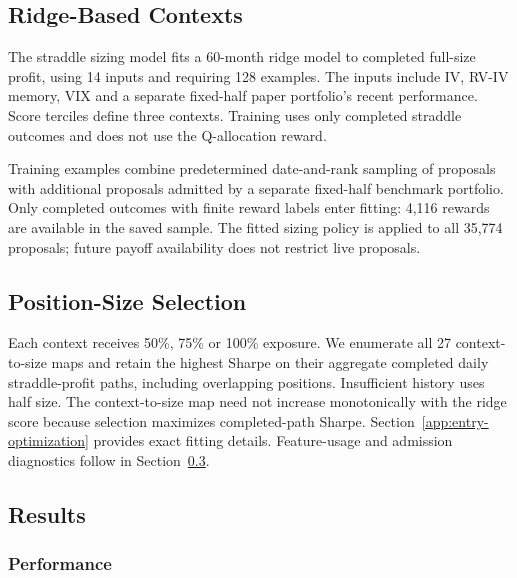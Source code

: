 \subsection{Ridge-Based Contexts}\label{sec:straddle-sizing}

The straddle sizing model fits a 60-month ridge model to completed full-size profit, using 14 inputs and requiring 128 examples. The inputs include IV, RV-IV memory, VIX and a separate fixed-half paper portfolio's recent performance. Score terciles define three contexts. Training uses only completed straddle outcomes and does not use the Q-allocation reward.

Training examples combine predetermined date-and-rank sampling of proposals with additional proposals admitted by a separate fixed-half benchmark portfolio. Only completed outcomes with finite reward labels enter fitting: 4,116 rewards are available in the saved sample. The fitted sizing policy is applied to all 35,774 proposals; future payoff availability does not restrict live proposals.

\subsection{Position-Size Selection}\label{sec:straddle-size-map}

Each context receives 50\%, 75\% or 100\% exposure. We enumerate all 27 context-to-size maps and retain the highest Sharpe on their aggregate completed daily straddle-profit paths, including overlapping positions. Insufficient history uses half size. The context-to-size map need not increase monotonically with the ridge score because selection maximizes completed-path Sharpe. Section~\ref{app:entry-optimization} provides exact fitting details. Feature-usage and admission diagnostics follow in Section~\ref{sec:straddle-results}.

\subsection{Results}\label{sec:straddle-results}

\subsubsection{Performance}

